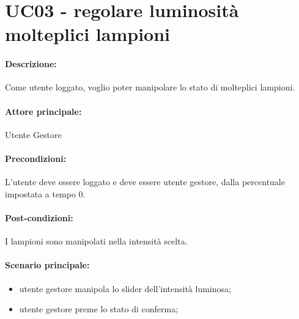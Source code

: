 \section{UC03 - regolare luminosità molteplici lampioni}

\paragraph{Descrizione:}
Come utente loggato, voglio poter manipolare lo stato di molteplici lampioni.

\paragraph{Attore principale:}

Utente Gestore

\paragraph{Precondizioni:}
L'utente deve essere loggato e deve essere utente gestore, dalla percentuale impostata a tempo 0.

\paragraph{Post-condizioni:}
I lampioni sono manipolati nella intensità scelta.
\paragraph{Scenario principale:}
\begin{itemize}
    \item utente gestore manipola lo slider dell'intensità luminosa;
    \item utente gestore preme lo stato di conferma;
\end{itemize}
